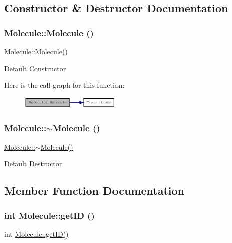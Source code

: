 \subsection{Constructor \& Destructor Documentation}
\hypertarget{classMolecule_a7e7d290ae641518ad4c4d5303b519d0f}{
\subsubsection[{Molecule}]{\setlength{\rightskip}{0pt plus 5cm}Molecule::Molecule ()}}
\label{classMolecule_a7e7d290ae641518ad4c4d5303b519d0f}
\hyperlink{classMolecule_a7e7d290ae641518ad4c4d5303b519d0f}{Molecule::Molecule()}

Default Constructor 

Here is the call graph for this function:\nopagebreak
\begin{figure}[H]
\begin{center}
\leavevmode
\includegraphics[width=137pt]{classMolecule_a7e7d290ae641518ad4c4d5303b519d0f_cgraph}
\end{center}
\end{figure}
\hypertarget{classMolecule_a1ff980b574a62526abff3d631c83bf94}{
\subsubsection[{$\sim$Molecule}]{\setlength{\rightskip}{0pt plus 5cm}Molecule::$\sim$Molecule ()}}
\label{classMolecule_a1ff980b574a62526abff3d631c83bf94}
\hyperlink{classMolecule_a1ff980b574a62526abff3d631c83bf94}{Molecule::$\sim$Molecule()}

Default Destructor 

\subsection{Member Function Documentation}
\hypertarget{classMolecule_a9a596dbbdced6d8cec10ad158d4a9f2a}{
\subsubsection[{getID}]{\setlength{\rightskip}{0pt plus 5cm}int Molecule::getID ()}}
\label{classMolecule_a9a596dbbdced6d8cec10ad158d4a9f2a}
int \hyperlink{classMolecule_a9a596dbbdced6d8cec10ad158d4a9f2a}{Molecule::getID()}

